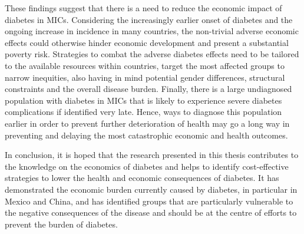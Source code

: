 These findings suggest that there is a need to reduce the economic impact of diabetes in \acp{MIC}. Considering the increasingly earlier onset of diabetes and the ongoing increase in incidence in many countries, the non-trivial adverse economic effects could otherwise hinder economic development and present a substantial poverty risk. Strategies to combat the adverse diabetes effects need to be tailored to the available resources within countries, target the most affected groups to narrow inequities, also having in mind potential gender differences, structural constraints and the overall disease burden. Finally, there is a large undiagnosed population with diabetes in \acp{MIC} that is likely to experience severe diabetes complications if identified very late. Hence, ways to diagnose this population earlier in order to prevent further deterioration of health may go a long way in preventing and delaying the most catastrophic economic and health outcomes.

In conclusion, it is hoped that the research presented in this thesis contributes to the knowledge on the economics of diabetes and helps to identify cost-effective strategies to lower the health and economic consequences of diabetes. It has demonstrated the economic burden currently caused by diabetes, in particular in Mexico and China, and has identified groups that are particularly vulnerable to the negative consequences of the disease and should be at the centre of efforts to prevent the burden of diabetes.